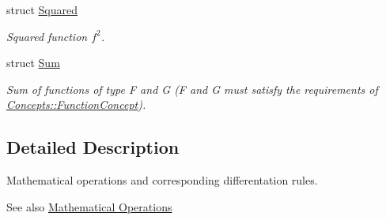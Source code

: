 \begin{DoxyCompactItemize}
struct \hyperlink{structFunG_1_1MathematicalOperations_1_1Squared}{Squared}
\begin{DoxyCompactList}\small\item\em Squared function $f^2$. \end{DoxyCompactList}\item 
struct \hyperlink{structFunG_1_1MathematicalOperations_1_1Sum}{Sum}
\begin{DoxyCompactList}\small\item\em Sum of functions of type F and G (F and G must satisfy the requirements of \hyperlink{structFunG_1_1Concepts_1_1FunctionConcept}{Concepts\+::\+Function\+Concept}). \end{DoxyCompactList}\end{DoxyCompactItemize}


\subsection{Detailed Description}
Mathematical operations and corresponding differentation rules. 

\begin{DoxySeeAlso}{See also}
\hyperlink{group__MathematicalOperationsGroup}{Mathematical Operations} 
\end{DoxySeeAlso}
